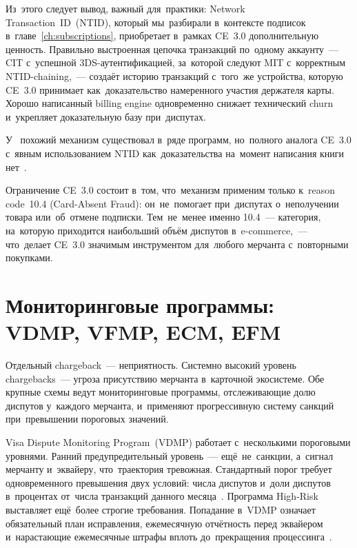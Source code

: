 Из~этого следует вывод, важный для~практики: Network Transaction~ID~(NTID),
который мы~разбирали в~контексте подписок в~главе~\ref{ch:subscriptions},
приобретает в~рамках CE~3.0 дополнительную ценность. Правильно выстроенная
цепочка транзакций по~одному аккаунту~--- CIT с~успешной 3DS-аутентификацией,
за~которой следуют MIT с~корректным NTID-chaining,~--- создаёт историю
транзакций с~того~же устройства, которую CE~3.0 принимает как~доказательство
намеренного участия держателя карты. Хорошо написанный billing engine
одновременно снижает технический churn и~укрепляет доказательную базу
при~диспутах.

У~ похожий механизм существовал в~ряде программ, но~полного
аналога CE~3.0 с~явным использованием NTID как~доказательства на~момент
написания книги нет~.

Ограничение CE~3.0 состоит в~том, что~механизм применим только к~reason
code~10.4 (Card-Absent Fraud): он~не~помогает при~диспутах о~неполучении
товара или~об~отмене подписки. Тем~не~менее именно 10.4~--- категория,
на~которую приходится наибольший объём диспутов в~e-commerce,~--- что~делает
CE~3.0 значимым инструментом для~любого мерчанта с~повторными покупками.


\section{Мониторинговые программы: VDMP, VFMP, ECM, EFM}
\label{sec:disputes-monitoring}

Отдельный chargeback~--- неприятность. Системно высокий уровень
chargebacks~--- угроза присутствию мерчанта в~карточной экосистеме.
Обе крупные схемы ведут мониторинговые программы, отслеживающие долю
диспутов у~каждого мерчанта, и~применяют прогрессивную систему санкций
при~превышении пороговых значений.

Visa Dispute Monitoring Program~(VDMP) работает с~несколькими
пороговыми уровнями. Ранний предупредительный уровень~--- ещё~не~санкции,
а~сигнал мерчанту и~эквайеру, что~траектория тревожная. Стандартный
порог требует одновременного превышения двух условий: числа диспутов
и~доли диспутов в~процентах от~числа транзакций данного
месяца~.
Программа High-Risk выставляет ещё~более строгие требования. Попадание
в~VDMP означает обязательный план исправления, ежемесячную отчётность
перед эквайером и~нарастающие ежемесячные штрафы вплоть до~прекращения
процессинга~.

